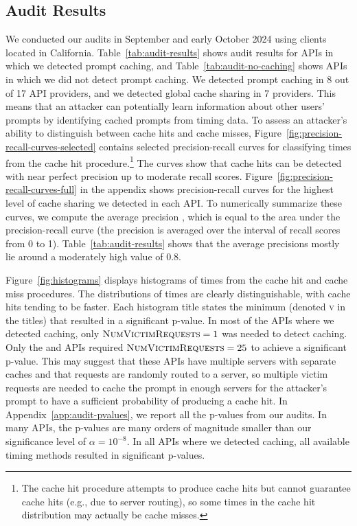\subsection{Audit Results}

We conducted our audits in September and early October 2024 using clients located in California. Table~\ref{tab:audit-results} shows audit results for APIs in which we detected prompt caching, and Table~\ref{tab:audit-no-caching} shows APIs in which we did not detect prompt caching. We detected prompt caching in 8 out of 17 API providers, and we detected global cache sharing in 7 providers. This means that an attacker can potentially learn information about other users' prompts by identifying cached prompts from timing data. To assess an attacker's ability to distinguish between cache hits and cache misses, Figure~\ref{fig:precision-recall-curves-selected} contains selected precision-recall curves for classifying times from the cache hit procedure.\footnote{The cache hit procedure attempts to produce cache hits but cannot guarantee cache hits (e.g., due to server routing), so some times in the cache hit distribution may actually be cache misses.} The curves show that cache hits can be detected with near perfect precision up to moderate recall scores. Figure~\ref{fig:precision-recall-curves-full} in the appendix shows precision-recall curves for the highest level of cache sharing we detected in each API. To numerically summarize these curves, we compute the average precision \cite{zhu2004recall}, which is equal to the area under the precision-recall curve (the precision is averaged over the interval of recall scores from 0 to 1). Table~\ref{tab:audit-results} shows that the average precisions mostly lie around a moderately high value of 0.8.



Figure~\ref{fig:histograms} displays histograms of times from the cache hit and cache miss procedures. The distributions of times are clearly distinguishable, with cache hits tending to be faster. Each histogram title states the minimum \NumVictimRequests{} (denoted \textsc{v} in the titles) that resulted in a significant p-value.
In most of the APIs where we detected caching, only $\textsc{NumVictimRequests}{} = 1$ was needed to detect caching. Only the \OpenAI{} and \Azure{} \OpenAIEmbeddingModel{} APIs required $\textsc{NumVictimRequests}{} = 25$ to achieve a significant p-value. This may suggest that these APIs have multiple servers with separate caches and that requests are randomly routed to a server, so multiple victim requests are needed to cache the prompt in enough servers for the attacker's prompt to have a sufficient probability of producing a cache hit. In Appendix~\ref{app:audit-pvalues}, we report all the p-values from our audits. In many APIs, the p-values are many orders of magnitude smaller than our significance level of $\alpha = 10^{-8}$. In all APIs where we detected caching, all available timing methods resulted in significant p-values.



